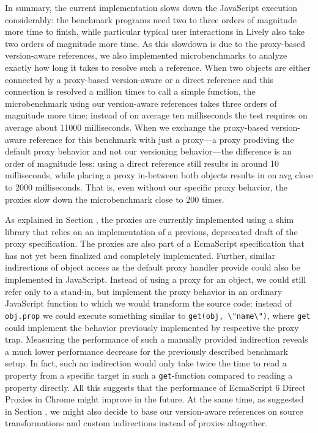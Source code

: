 In summary, the current implementation slows down the JavaScript execution considerably: the benchmark programs need two to three orders of magnitude more time to finish, while particular typical user interactions in Lively also take two orders of magnitude more time.
As this slowdown is due to the proxy-based version-aware references, we also implemented microbenchmarks to analyze exactly how long it takes to resolve such a reference.
When two objects are either connected by a proxy-based version-aware or a direct reference and this connection is resolved a million times to call a simple function, the microbenchmark using our version-aware references takes three orders of magnitude more time: instead of on average ten milliseconds the test requires on average about 11000 milliseconds.
When we exchange the proxy-based version-aware reference for this benchmark with just a proxy---a proxy prodiving the default proxy behavior and not our versioning behavior---the difference is an order of magnitude less: using a direct reference still results in around 10 milliseconds, while placing a proxy in-between both objects results in on avg close to 2000 milliseconds.
That is, even without our specific proxy behavior, the proxies slow down the microbenchmark close to 200 times.

As explained in Section , the proxies are currently implemented using a shim library that relies on an implementation of a previous, deprecated draft of the proxy specification.
The proxies are also part of a EcmaScript specification that has not yet been finalized and completely implemented.
Further, similar indirections of object access as the default proxy handler provide could also be implemented in JavaScript.
Instead of using a proxy for an object, we could still refer only to a stand-in, but implement the proxy behavior in an ordinary JavaScript function to which we would transform the source code: instead of \lstinline{obj.prop} we could execute something similar to \lstinline{get(obj, \"name\")}, where \lstinline{get} could implement the behavior previously implemented by respective the proxy trap.
Measuring the performance of such a manually provided indirection reveals a much lower performance decrease for the previously described benchmark setup.
In fact, such an indirection would only take twice the time to read a property from a specific target in such a \lstinline{get}-function compared to reading a property directly. 
All this suggests that the performance of EcmaScript 6 Direct Proxies in Chrome might improve in the future.
At the same time, as suggested in Section , we might also decide to base our version-aware references on source transformations and custom indirections instead of proxies altogether.
